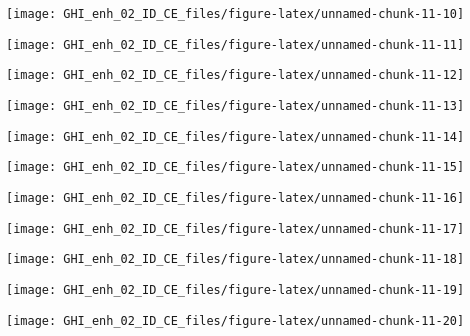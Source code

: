 \documentclass[
  10pt,
  a4paper,oneside]{article}
\begin{document}
\begin{center}\texttt{[image: GHI\_enh\_02\_ID\_CE\_files/figure-latex/unnamed-chunk-11-10]} \end{center}

\begin{center}\texttt{[image: GHI\_enh\_02\_ID\_CE\_files/figure-latex/unnamed-chunk-11-11]} \end{center}

\begin{center}\texttt{[image: GHI\_enh\_02\_ID\_CE\_files/figure-latex/unnamed-chunk-11-12]} \end{center}

\begin{center}\texttt{[image: GHI\_enh\_02\_ID\_CE\_files/figure-latex/unnamed-chunk-11-13]} \end{center}

\begin{center}\texttt{[image: GHI\_enh\_02\_ID\_CE\_files/figure-latex/unnamed-chunk-11-14]} \end{center}

\begin{center}\texttt{[image: GHI\_enh\_02\_ID\_CE\_files/figure-latex/unnamed-chunk-11-15]} \end{center}

\begin{center}\texttt{[image: GHI\_enh\_02\_ID\_CE\_files/figure-latex/unnamed-chunk-11-16]} \end{center}

\begin{center}\texttt{[image: GHI\_enh\_02\_ID\_CE\_files/figure-latex/unnamed-chunk-11-17]} \end{center}

\begin{center}\texttt{[image: GHI\_enh\_02\_ID\_CE\_files/figure-latex/unnamed-chunk-11-18]} \end{center}

\begin{center}\texttt{[image: GHI\_enh\_02\_ID\_CE\_files/figure-latex/unnamed-chunk-11-19]} \end{center}

\begin{center}\texttt{[image: GHI\_enh\_02\_ID\_CE\_files/figure-latex/unnamed-chunk-11-20]} \end{center}
\end{document}
